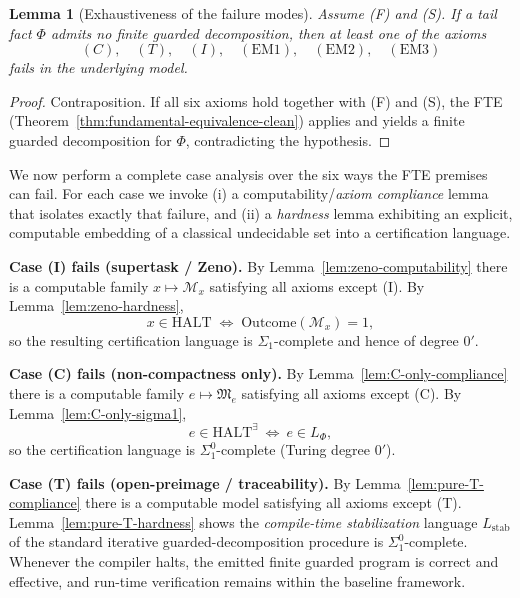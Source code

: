 \documentclass[12pt]{article}
\theoremstyle{definition}
\theoremstyle{plain}
\newtheorem{lemma}{Lemma}[section]
\begin{document}
\begin{lemma}[Exhaustiveness of the failure modes]
\label{lem:exhaustiveness-failure}
Assume (F) and (S). If a tail fact \(\Phi\) admits no finite guarded
decomposition, then at least one of the axioms
\[
(C),\quad (T),\quad (I),\quad (\mathrm{EM1}),\quad (\mathrm{EM2}),\quad (\mathrm{EM3})
\]
fails in the underlying model.
\end{lemma}

\begin{proof}
Contraposition.  If all six axioms hold together with (F) and (S), the FTE
(Theorem~\ref{thm:fundamental-equivalence-clean}) applies and yields a finite
guarded decomposition for \(\Phi\), contradicting the hypothesis.
\end{proof}

We now perform a complete case analysis over the six ways the FTE premises can
fail.  For each case we invoke (i) a computability/\emph{axiom compliance}
lemma that isolates exactly that failure, and (ii) a \emph{hardness} lemma
exhibiting an explicit, computable embedding of a classical undecidable set
into a certification language.

\medskip
\noindent\textbf{Case (I) fails (supertask / Zeno).}
By Lemma~\ref{lem:zeno‐computability} there is a computable family
\(x\mapsto\mathcal M_x\) satisfying all axioms except (I).  By
Lemma~\ref{lem:zeno‐hardness},
\[
x\in\mathrm{HALT}\;\Longleftrightarrow\; \mathrm{Outcome}(\mathcal M_x)=1,
\]
so the resulting certification language is \(\Sigma_1\)-complete and hence of
degree \(0'\).

\medskip
\noindent\textbf{Case (C) fails (non-compactness only).}
By Lemma~\ref{lem:C-only-compliance} there is a computable family
$e\mapsto\mathfrak M_e$ satisfying all axioms except (C).
By Lemma~\ref{lem:C-only-sigma1},
\[
e\in \mathrm{HALT}^{\exists}\ \Longleftrightarrow\ e\in L_\Phi,
\]
so the certification language is $\Sigma^0_1$-complete (Turing degree $0'$).


\medskip
\noindent\textbf{Case (T) fails (open-preimage / traceability).}
By Lemma~\ref{lem:pure-T-compliance} there is a computable model
satisfying all axioms except (T).  Lemma~\ref{lem:pure-T-hardness}
shows the \emph{compile-time stabilization} language
$L_{\mathrm{stab}}$ of the standard iterative guarded-decomposition
procedure is $\Sigma^0_1$-complete.  Whenever the compiler halts, the
emitted finite guarded program is correct and effective, and run-time
verification remains within the baseline framework.
\end{document}
